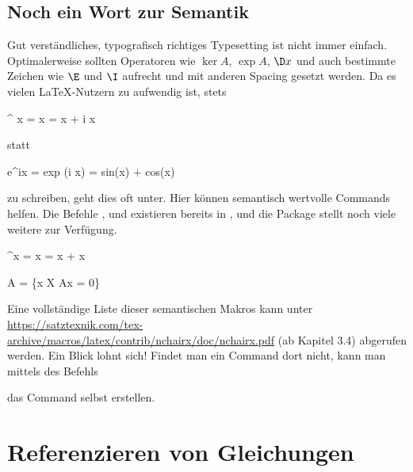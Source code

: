 \subsection{Noch ein Wort zur Semantik}
Gut verständliches, typografisch richtiges Typesetting ist nicht immer einfach.
Optimalerweise sollten Operatoren wie $\ker A$, $\exp A$, $\D x$ und auch bestimmte Zeichen wie $\E$ und $\I$ aufrecht und mit anderen Spacing gesetzt werden.
Da es vielen \LaTeX{}-Nutzern zu aufwendig ist, stets 
\begin{latexlisting}
	^{ x} =   x =  x + i  x
\end{latexlisting}
statt
\begin{latexlisting}
	e^{ix} = exp (i x) = sin(x) + cos(x)
\end{latexlisting}
zu schreiben, geht dies oft unter.
Hier können semantisch wertvolle Commands helfen. Die Befehle ,  und  existieren bereits in , und die Package  stellt noch viele weitere zur Verfügung.
\begin{latexlisting}
	\E^{\I x} = \exp \I x = \sin x + \cos x
\end{latexlisting}
\begin{latexlisting}
	\ker A = \{x \in X \mid Ax = 0\}
\end{latexlisting}
Eine vollständige Liste dieser semantischen Makros kann unter \url{https://satztexnik.com/tex-archive/macros/latex/contrib/nchairx/doc/nchairx.pdf} (ab Kapitel 3.4) abgerufen werden.
Ein Blick lohnt sich!
Findet man ein Command dort nicht, kann man mittels des Befehls
\begin{latexlisting}
	\DeclareMathOperator{coker}
\end{latexlisting}
das Command  selbst erstellen.

\section{Referenzieren von Gleichungen}

